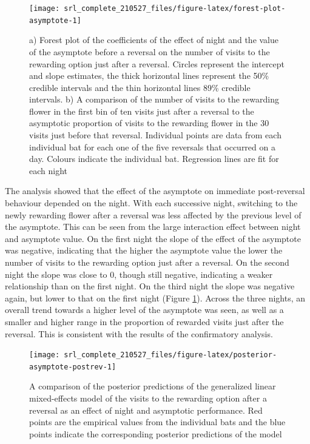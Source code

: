 \documentclass[
]{article}
\begin{document}
\begin{figure}[H]

{\centering \texttt{[image: srl\_complete\_210527\_files/figure-latex/forest-plot-asymptote-1]} 

}

\caption{a) Forest plot of the coefficients of the effect of night and the value of the asymptote before a reversal on the number of visits to the rewarding option just after a reversal. Circles represent the intercept and slope estimates, the thick horizontal lines represent the 50\% credible intervals and the thin horizontal lines 89\% credible intervals. b) A comparison of the number of visits to the rewarding flower in the first bin of ten visits just after a reversal to the asymptotic proportion of visits to the rewarding flower in the 30 visits just before that reversal. Individual points are data from each individual bat for each one of the five reversals that occurred on a day. Colours indicate the individual bat. Regression lines are fit for each night}\label{fig:forest-plot-asymptote}
\end{figure}

The analysis showed that the effect of the asymptote on immediate post-reversal behaviour depended on the night. With each successive night, switching to the newly rewarding flower after a reversal was less affected by the previous level of the asymptote. This can be seen from the large interaction effect between night and asymptote value. On the first night the slope of the effect of the asymptote was negative, indicating that the higher the asymptote value the lower the number of visits to the rewarding option just after a reversal. On the second night the slope was close to 0, though still negative, indicating a weaker relationship than on the first night. On the third night the slope was negative again, but lower to that on the first night (Figure \ref{fig:forest-plot-asymptote}). Across the three nights, an overall trend towards a higher level of the asymptote was seen, as well as a smaller and higher range in the proportion of rewarded visits just after the reversal. This is consistent with the results of the confirmatory analysis.



\begin{figure}[H]

{\centering \texttt{[image: srl\_complete\_210527\_files/figure-latex/posterior-asymptote-postrev-1]} 

}

\caption{A comparison of the posterior predictions of the generalized linear mixed-effects model of the visits to the rewarding option after a reversal as an effect of night and asymptotic performance. Red points are the empirical values from the individual bats and the blue points indicate the corresponding posterior predictions of the model}\label{fig:posterior-asymptote-postrev}
\end{figure}
\end{document}
